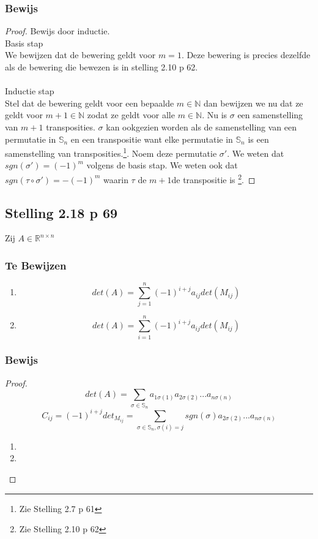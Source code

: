 \documentclass[lineaire_algebra_oplossingen.tex]{subfiles}
\begin{document}
\subsubsection*{Bewijs}
\begin{proof}
Bewijs door inductie.\\
\textsf{Basis stap}\\
We bewijzen dat de bewering geldt voor $m=1$. Deze bewering is precies dezelfde als de bewering die bewezen is in stelling 2.10 p 62.\\\\
\textsf{Inductie stap}\\
Stel dat de bewering geldt voor een bepaalde $m \in \mathbb{N}$ dan bewijzen we nu dat ze geldt voor $m+1 \in \mathbb{N}$ zodat ze geldt voor alle $m \in \mathbb{N}$.
Nu is $\sigma$ een samenstelling van $m+1$ transposities. $\sigma$ kan ookgezien worden als de samenstelling van een permutatie in $\mathbb{S}_n$ en een transpositie want elke permutatie in $\mathbb{S}_n$ is een samenstelling van transposities.\footnote{Zie Stelling 2.7 p 61}. Noem deze permutatie $\sigma'$. We weten dat $sgn(\sigma') = (-1)^m$ volgens de basis stap. We weten ook dat $sgn(\tau \circ \sigma') = -(-1)^m$ waarin $\tau$ de $m+1$de transpositie is \footnote{Zie Stelling 2.10 p 62}.
\end{proof}

\subsection{Stelling 2.18 p 69}
Zij $A \in \mathbb{R}^{n\times n}$
\subsubsection*{Te Bewijzen}
\begin{enumerate}
\item
\[
det(A) = \sum_{j=1}^n(-1)^{i+j}a_{ij}det(M_{ij})
\]
\item
\[
det(A) = \sum_{i=1}^n(-1)^{i+j}a_{ij}det(M_{ij})
\]
\end{enumerate}
\subsubsection*{Bewijs}
\begin{proof}
\[
det(A) = \sum_{\sigma \in \mathbb{S}_n} a_{1\sigma(1)}a_{2\sigma(2)}...a_{n\sigma(n)}
\]
\[
C_{ij} = (-1)^{i+j}det_{M_{ij}} = \sum_{\sigma \in \mathbb{S}_n,\sigma(i)=j}sgn(\sigma)a_{2\sigma(2)}...a_{n\sigma(n)}
\]
\begin{enumerate}
\item

\item

\end{enumerate}
\end{proof}
\end{document}
